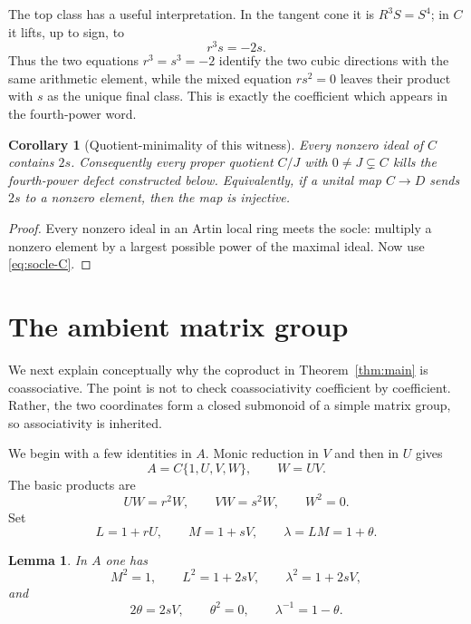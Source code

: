 \documentclass[11pt]{amsart}
\newtheorem{lemma}[theorem]{Lemma}
\newtheorem{corollary}[theorem]{Corollary}
\theoremstyle{definition}
\theoremstyle{remark}
\begin{document}
The top class has a useful interpretation.  In the tangent cone it is
\(R^3S=S^4\); in \(C\) it lifts, up to sign, to
\[
 r^3s=-2s.
\]
Thus the two equations \(r^3=s^3=-2\) identify the two cubic directions
with the same arithmetic element, while the mixed equation \(rs^2=0\)
leaves their product with \(s\) as the unique final class.  This is exactly
the coefficient which appears in the fourth-power word.

\begin{corollary}[Quotient-minimality of this witness]\label{cor:quotient-minimal}
Every nonzero ideal of \(C\) contains \(2s\).  Consequently every proper
quotient \(C/J\) with \(0\ne J\subsetneq C\) kills the fourth-power defect
constructed below.  Equivalently, if a unital map \(C\to D\) sends \(2s\)
to a nonzero element, then the map is injective.
\end{corollary}

\begin{proof}
Every nonzero ideal in an Artin local ring meets the socle: multiply a
nonzero element by a largest possible power of the maximal ideal.  Now use
\eqref{eq:socle-C}.
\end{proof}

\section{The ambient matrix group}\label{sec:ambient}

We next explain conceptually why the coproduct in Theorem~\ref{thm:main}
is coassociative.  The point is not to check coassociativity coefficient by
coefficient.  Rather, the two coordinates form a closed submonoid of a
simple matrix group, so associativity is inherited.

We begin with a few identities in \(A\).  Monic reduction in \(V\) and
then in \(U\) gives
\begin{equation}\label{eq:A-free}
 A=C\{1,U,V,W\},\qquad W=UV.
\end{equation}
The basic products are
\begin{equation}\label{eq:W-products}
 UW=r^2W,
 \qquad
 VW=s^2W,
 \qquad
 W^2=0.
\end{equation}
Set
\begin{equation}\label{eq:L-M-theta}
 L=1+rU,
 \qquad
 M=1+sV,
 \qquad
 \lambda=LM=1+\theta.
\end{equation}

\begin{lemma}\label{lem:theta}
In \(A\) one has
\begin{equation}\label{eq:factor-squares}
 M^2=1,
 \qquad
 L^2=1+2sV,
 \qquad
 \lambda^2=1+2sV,
\end{equation}
and
\begin{equation}\label{eq:theta-core}
 2\theta=2sV,
 \qquad
 \theta^2=0,
 \qquad
 \lambda^{-1}=1-\theta.
\end{equation}
\end{lemma}
\end{document}
